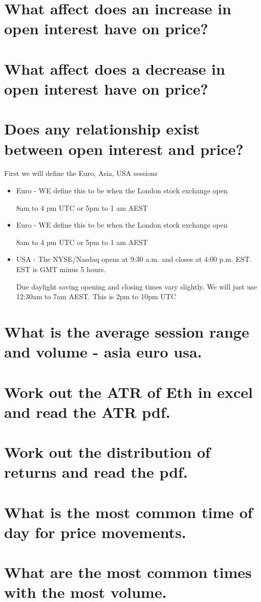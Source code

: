 \section{ What affect does an increase in open interest have on price?}
\section{ What affect does a decrease in open interest have on price?}
\section{ Does any relationship exist between open interest and price?}

First we will define the Euro, Asia, USA sessions

\begin{itemize}
\item Euro - WE define this to be when the London stock exchange open

8am to 4 pm UTC or 5pm to 1 am AEST
\item Euro - WE define this to be when the London stock exchange open

8am to 4 pm UTC or 5pm to 1 am AEST
\item USA -
The NYSE/Nasdaq opens at 9:30 a.m. and closes at 4:00 p.m. EST.
EST is GMT minus 5 hours.

Due daylight saving opening and closing times vary slightly. We will just use 12:30am to 7am AEST. This is 2pm to 10pm UTC
\end{itemize}
\section{ What is the average session range and volume - asia euro usa.}
\section{ Work out the ATR of Eth in excel and read the ATR pdf.}
\section{ Work out the distribution of returns and read the pdf.}
\section{ What is the most common time of day for price movements.}
\section{ What are the most common times with the most volume.}
